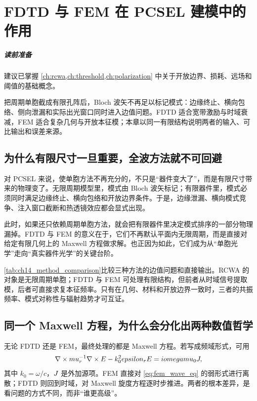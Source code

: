 \chapter{FDTD 与 FEM 在 PCSEL 建模中的作用}
\label{ch:fdtd-fem}

\paragraph{读前准备}
建议已掌握 \cref{ch:rcwa,ch:threshold,ch:polarization} 中关于开放边界、损耗、远场和阈值的基础概念。

把周期单胞截成有限孔阵后，Bloch 波矢不再足以标记模式：边缘终止、横向包络、侧向泄漏和实际出光窗口同时进入边值问题。FDTD 适合宽带激励与时域衰减，FEM 适合复杂几何与开放本征模；本章以同一有限结构说明两者的输入、可比输出和误差来源。

\section{为什么有限尺寸一旦重要，全波方法就不可回避}
对 PCSEL 来说，使单胞方法不再充分的，不只是“器件变大了”，而是有限尺寸带来的物理变了。无限周期模型里，模式由 Bloch 波矢标记；有限器件里，模式必须同时满足边缘终止、横向包络和开放边界条件。于是，边缘泄漏、横向模式竞争、注入窗口截断和热透镜效应都会显式出现。

此时，如果还只依赖周期单胞方法，就会把有限器件里决定模式排序的一部分物理漏掉。FDTD 与 FEM 的意义在于，它们不再默认平面内无限周期，而是直接对给定有限几何上的 Maxwell 方程做求解。也正因为如此，它们成为从“单胞光学”走向“真实器件光学”的关键台阶。



\cref{tab:ch14_method_comparison}比较三种方法的边值问题和直接输出。RCWA 的对象是无限周期单胞；FDTD 与 FEM 可处理有限结构，但前者从时域信号提取模，后者可直接求复本征频率。只有在几何、材料和开放边界一致时，三者的共振频率、模式对称性与辐射趋势才可互证。

\section{同一个 Maxwell 方程，为什么会分化出两种数值哲学}
无论 FDTD 还是 FEM，最终处理的都是 Maxwell 方程。若写成频域形式，可用
\begin{equation}
\nabla\times mu_r^{-1}\nabla\times E
-
k_0^2epsilon_rE
=
iomegamu_0J,
\label{eq:fem_wave_eq}
\end{equation}
其中 $k_0=\omega/c$，$J$ 是外加源项。FEM 直接对 \cref{eq:fem_wave_eq} 的弱形式进行离散；FDTD 则回到时域，对 Maxwell 旋度方程逐时步推进。两者的根本差异，是看问题的方式不同，而非“谁更高级”。

